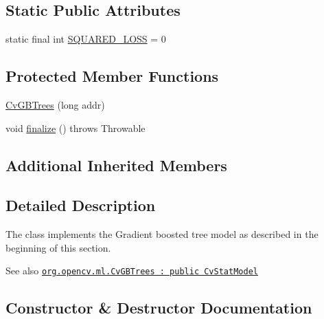 \subsection*{Static Public Attributes}
\begin{DoxyCompactItemize}
\item 
static final int \mbox{\hyperlink{classorg_1_1opencv_1_1ml_1_1_cv_g_b_trees_a2fa66daa8dd429f356068b3856b891fd}{S\+Q\+U\+A\+R\+E\+D\+\_\+\+L\+O\+SS}} = 0
\end{DoxyCompactItemize}
\subsection*{Protected Member Functions}
\begin{DoxyCompactItemize}
\item 
\mbox{\hyperlink{classorg_1_1opencv_1_1ml_1_1_cv_g_b_trees_a5b414f4e7eebad65399c0f80e11483c7}{Cv\+G\+B\+Trees}} (long addr)
\item 
void \mbox{\hyperlink{classorg_1_1opencv_1_1ml_1_1_cv_g_b_trees_a50a588f4d215381826abc7c622f22969}{finalize}} ()  throws Throwable 
\end{DoxyCompactItemize}
\subsection*{Additional Inherited Members}


\subsection{Detailed Description}
The class implements the Gradient boosted tree model as described in the beginning of this section.

\begin{DoxySeeAlso}{See also}
\href{http://docs.opencv.org/modules/ml/doc/gradient_boosted_trees.html#cvgbtrees}{\tt org.\+opencv.\+ml.\+Cv\+G\+B\+Trees \+: public Cv\+Stat\+Model} 
\end{DoxySeeAlso}


\subsection{Constructor \& Destructor Documentation}
\mbox{\label{classorg_1_1opencv_1_1ml_1_1_cv_g_b_trees_a5b414f4e7eebad65399c0f80e11483c7}} 
